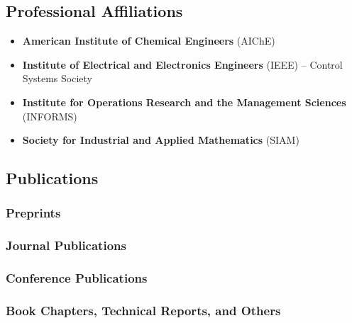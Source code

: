 \message{ !name(shin-abet.tex)}\documentclass[letterpaper, 11pt]{article}
\begin{document}
\subsection*{Professional Affiliations}
\begin{itemize}[label=$\bullet$,itemsep=0pt]
\item \textbf{American Institute of Chemical Engineers} (AIChE)
\item \textbf{Institute of Electrical and Electronics Engineers} (IEEE) -- Control Systems Society
\item \textbf{Institute for Operations Research and the Management Sciences} (INFORMS)
\item \textbf{Society for Industrial and Applied Mathematics} (SIAM)
\end{itemize}
\let\OLDthebibliography\thebibliography
\renewcommand\thebibliography[1]{
  \OLDthebibliography{#1}
  \setlength{\parskip}{0pt}
  \setlength{\itemsep}{0pt}
}

\subsection*{Publications}
\subsubsection*{Preprints}
\renewcommand*{\labelenumi}{[P\theenumi]}
\subsubsection*{Journal Publications}
\renewcommand*{\labelenumi}{[J\theenumi]}
\subsubsection*{Conference Publications}
\renewcommand*{\labelenumi}{[C\theenumi]}
\subsubsection*{Book Chapters, Technical Reports, and Others}
\renewcommand*{\labelenumi}{[B\theenumi]}
\end{document}
